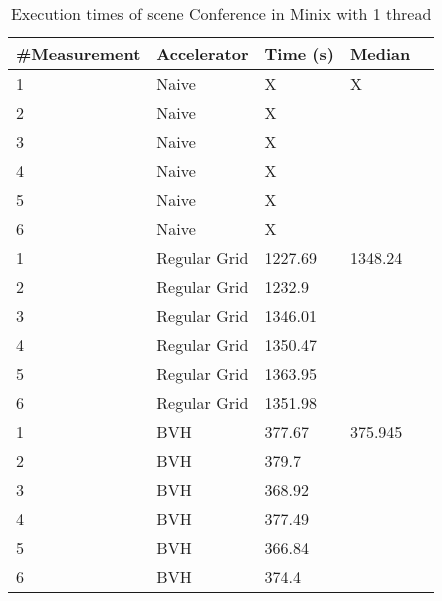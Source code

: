 \begin{table}[H]
	\small
	\begin{tabular}{|l|l|l|l|l|}
		\hline
		\#Measurement & Accelerator & Time (s) & Median \\ \hline
		1 & Naive & X & X \\ \hline
		2 & Naive & X & \\ \hline
		3 & Naive & X & \\ \hline
		4 & Naive & X & \\ \hline
		5 & Naive & X & \\ \hline
		6 & Naive & X & \\ \hline
		1 & Regular Grid & 1227.69 & 1348.24 \\ \hline
		2 & Regular Grid & 1232.9 & \\ \hline
		3 & Regular Grid & 1346.01 & \\ \hline
		4 & Regular Grid & 1350.47 & \\ \hline
		5 & Regular Grid & 1363.95 & \\ \hline
		6 & Regular Grid & 1351.98 & \\ \hline
		1 & BVH & 377.67 & 375.945 \\ \hline
		2 & BVH & 379.7 & \\ \hline
		3 & BVH & 368.92 & \\ \hline
		4 & BVH & 377.49 & \\ \hline
		5 & BVH & 366.84 & \\ \hline
		6 & BVH & 374.4 & \\ \hline
	\end{tabular}
	\label{Time}
	\caption{Execution times of scene Conference in Minix with 1 thread}
\end{table}

